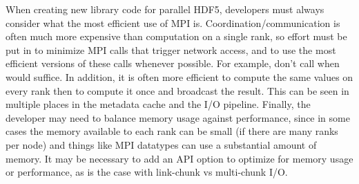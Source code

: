 \begin{itemize}
When creating new library code for parallel HDF5, developers must always consider what the most efficient use of MPI is. Coordination/communication is often much more expensive than computation on a single rank, so effort must be put in to minimize MPI calls that trigger network access, and to use the most efficient versions of these calls whenever possible. For example, don't call  when  would suffice. In addition, it is often more efficient to compute the same values on every rank then to compute it once and broadcast the result. This can be seen in multiple places in the metadata cache and the I/O pipeline. Finally, the developer may need to balance memory usage against performance, since in some cases the memory available to each rank can be small (if there are many ranks per node) and things like MPI datatypes can use a substantial amount of memory. It may be necessary to add an API option to optimize for memory usage or performance, as is the case with link-chunk vs multi-chunk I/O.

\end{itemize}
